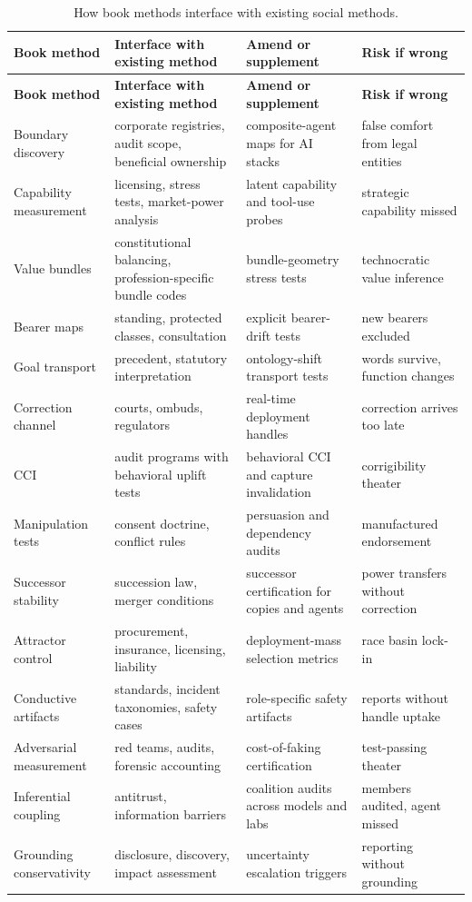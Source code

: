 \begin{refsection}
\renewcommand{\arraystretch}{1.15}
\begin{longtable}{@{}p{}p{}p{}p{}@{}}
\caption{How book methods interface with existing social methods.}\label{tab:institutional-interface}\\
\toprule
\textbf{Book method} & \textbf{Interface with existing method} & \textbf{Amend or supplement} & \textbf{Risk if wrong} \\
\midrule
\endfirsthead
\toprule
\textbf{Book method} & \textbf{Interface with existing method} & \textbf{Amend or supplement} & \textbf{Risk if wrong} \\
\midrule
\endhead
\bottomrule
\endfoot
Boundary discovery & corporate registries, audit scope, beneficial ownership & composite-agent maps for AI stacks & false comfort from legal entities \\
Capability measurement & licensing, stress tests, market-power analysis & latent capability and tool-use probes & strategic capability missed \\
Value bundles & constitutional balancing, profession-specific bundle codes & bundle-geometry stress tests & technocratic value inference \\
Bearer maps & standing, protected classes, consultation & explicit bearer-drift tests & new bearers excluded \\
Goal transport & precedent, statutory interpretation & ontology-shift transport tests & words survive, function changes \\
Correction channel & courts, ombuds, regulators & real-time deployment handles & correction arrives too late \\
CCI & audit programs with behavioral uplift tests & behavioral CCI and capture invalidation & corrigibility theater \\
Manipulation tests & consent doctrine, conflict rules & persuasion and dependency audits & manufactured endorsement \\
Successor stability & succession law, merger conditions & successor certification for copies and agents & power transfers without correction \\
Attractor control & procurement, insurance, licensing, liability & deployment-mass selection metrics & race basin lock-in \\
Conductive artifacts & standards, incident taxonomies, safety cases & role-specific safety artifacts & reports without handle uptake \\
Adversarial measurement & red teams, audits, forensic accounting & cost-of-faking certification & test-passing theater \\
Inferential coupling & antitrust, information barriers & coalition audits across models and labs & members audited, agent missed \\
Grounding conservativity & disclosure, discovery, impact assessment & uncertainty escalation triggers & reporting without grounding \\
\end{longtable}
\renewcommand{\arraystretch}{1.0}


\end{refsection}
